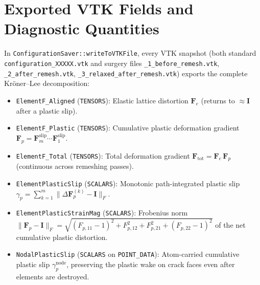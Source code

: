 \documentclass[11pt,a4paper]{article}
\newcommand{\code}[1]{\texttt{#1}}
\begin{document}
\section{Exported VTK Fields and Diagnostic Quantities}

In \code{ConfigurationSaver::writeToVTKFile}, every VTK snapshot (both standard \code{configuration\_XXXXX.vtk} and surgery files \code{\_1\_before\_remesh.vtk}, \code{\_2\_after\_remesh.vtk}, \code{\_3\_relaxed\_after\_remesh.vtk}) exports the complete Kr\"oner--Lee decomposition:
\begin{itemize}[nosep]
  \item \code{ElementF\_Aligned} (\code{TENSORS}): Elastic lattice distortion $\mathbf{F}_e$ (returns to $\approx \mathbf{I}$ after a plastic slip).
  \item \code{ElementF\_Plastic} (\code{TENSORS}): Cumulative plastic deformation gradient $\mathbf{F}_p = \mathbf{F}_m^{\text{slip}} \cdots \mathbf{F}_1^{\text{slip}}$.
  \item \code{ElementF\_Total} (\code{TENSORS}): Total deformation gradient $\mathbf{F}_{\text{tot}} = \mathbf{F}_e \, \mathbf{F}_p$ (continuous across remeshing passes).
  \item \code{ElementPlasticSlip} (\code{SCALARS}): Monotonic path-integrated plastic slip $\gamma_p = \sum_{k=1}^m \|\Delta\mathbf{F}_p^{(k)} - \mathbf{I}\|_F$.
  \item \code{ElementPlasticStrainMag} (\code{SCALARS}): Frobenius norm $\|\mathbf{F}_p - \mathbf{I}\|_F = \sqrt{(F_{p,11}-1)^2 + F_{p,12}^2 + F_{p,21}^2 + (F_{p,22}-1)^2}$ of the net cumulative plastic distortion.
  \item \code{NodalPlasticSlip} (\code{SCALARS} on \code{POINT\_DATA}): Atom-carried cumulative plastic slip $\gamma_p^{\text{node}}$, preserving the plastic wake on crack faces even after elements are destroyed.
\end{itemize}
\end{document}
